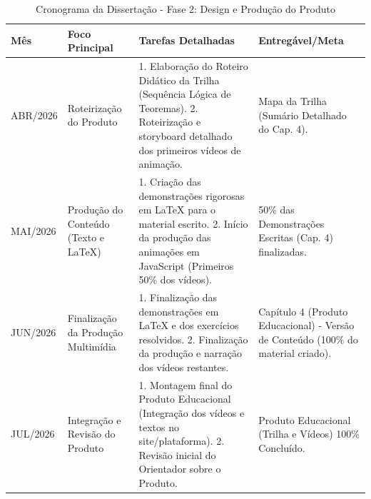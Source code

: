 \begin{table}[!ht]
    \centering
    \caption{Cronograma da Dissertação - Fase 2: Design e Produção do Produto}
    
    \begin{tabular}{p{2cm} p{2.7cm} p{7cm} p{2.5cm}}
    \hline
    \textbf{Mês} & \textbf{Foco Principal} & \textbf{Tarefas Detalhadas} & \textbf{Entregável/Meta}\\
    \hline
    ABR/2026 & Roteirização do Produto & 1. Elaboração do Roteiro Didático da Trilha (Sequência Lógica de Teoremas). 2. Roteirização e storyboard detalhado dos primeiros vídeos de animação. & Mapa da Trilha (Sumário Detalhado do Cap. 4).\\
    \hline
    MAI/2026 & Produção do Conteúdo (Texto e LaTeX) & 1. Criação das demonstrações rigorosas em LaTeX para o material escrito. 2. Início da produção das animações em JavaScript (Primeiros 50\% dos vídeos). & 50\% das Demonstrações Escritas (Cap. 4) finalizadas.\\
    \hline
    JUN/2026 & Finalização da Produção Multimídia & 1. Finalização das demonstrações em LaTeX e dos exercícios resolvidos. 2. Finalização da produção e narração dos vídeos restantes. & Capítulo 4 (Produto Educacional) - Versão de Conteúdo (100\% do material criado).\\
    \hline
    JUL/2026 & Integração e Revisão do Produto & 1. Montagem final do Produto Educacional (Integração dos vídeos e textos no site/plataforma). 2. Revisão inicial do Orientador sobre o Produto. & Produto Educacional (Trilha e Vídeos) 100\% Concluído.\\
    \hline
    \end{tabular} \label{tab:cronograma-fase2}
\end{table}


